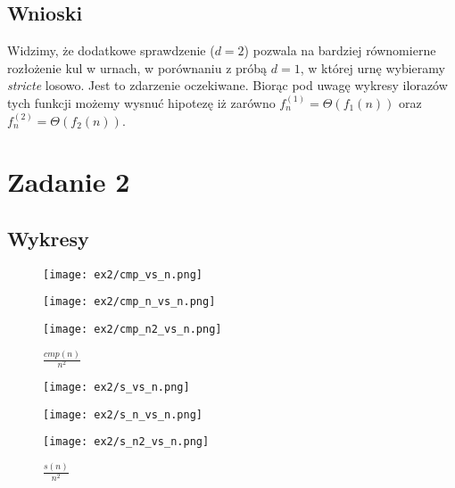 \documentclass{article}
\begin{document}
\subsection{Wnioski}

Widzimy, że dodatkowe sprawdzenie ($d=2$) pozwala na bardziej równomierne rozłożenie kul w urnach, w porównaniu z próbą $d=1$, w której urnę wybieramy \textit{stricte} losowo. Jest to zdarzenie oczekiwane. Biorąc pod uwagę wykresy ilorazów tych funkcji możemy wysnuć hipotezę iż zarówno
$f_n^{(1)} = \Theta(f_1(n))$ oraz $f_n^{(2)} = \Theta(f_2(n))$.

\section{Zadanie 2}

\subsection{Wykresy}

\begin{figure}[H]
    \centering
        \begin{minipage}{0.24\textwidth}
        \centering
        \texttt{[image: ex2/cmp\_vs\_n.png]}
        \caption{$cmp(n)$}
    \end{minipage}
        \begin{minipage}{0.24\textwidth}
        \centering
        \texttt{[image: ex2/cmp\_n\_vs\_n.png]}
        \caption{$\frac{cmp(n)}{n}$}
    \end{minipage}
        \begin{minipage}{0.24\textwidth}
        \centering
        \texttt{[image: ex2/cmp\_n2\_vs\_n.png]}
        \caption{$\frac{cmp(n)}{n^2}$}
    \end{minipage}
\end{figure}

\begin{figure}[H]
    \centering
        \begin{minipage}{0.24\textwidth}
        \centering
        \texttt{[image: ex2/s\_vs\_n.png]}
        \caption{$s(n)$}
    \end{minipage}
        \begin{minipage}{0.24\textwidth}
        \centering
        \texttt{[image: ex2/s\_n\_vs\_n.png]}
        \caption{$\frac{s(n)}{n}$}
    \end{minipage}
        \begin{minipage}{0.24\textwidth}
        \centering
        \texttt{[image: ex2/s\_n2\_vs\_n.png]}
        \caption{$\frac{s(n)}{n^2}$}
    \end{minipage}
\end{figure}
\end{document}
